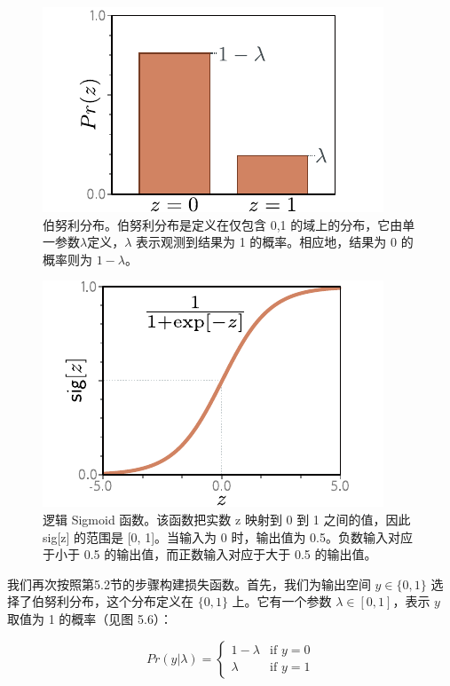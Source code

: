 \documentclass[lang=cn,newtx,10pt,scheme=chinese]{elegantbook}
\begin{document}
\begin{figure}[ht!]
	\centering
	\includegraphics[width=0.7\linewidth]{PDFFigures/UDLChap5PDF/LossBern.pdf}
	\caption{伯努利分布。伯努利分布是定义在仅包含 {0,1} 的域上的分布，它由单一参数\(\lambda\)定义，\(\lambda\) 表示观测到结果为 1 的概率。相应地，结果为 0 的概率则为 \(1 − \lambda\)。}
\end{figure}

\begin{figure}[ht!]
	\centering
	\includegraphics[width=0.7\linewidth]{PDFFigures/UDLChap5PDF/LossLogisticSigmoid.pdf}
	\caption{逻辑 Sigmoid 函数。该函数把实数 z 映射到 0 到 1 之间的值，因此 sig[z] 的范围是 [0, 1]。当输入为 0 时，输出值为 0.5。负数输入对应于小于 0.5 的输出值，而正数输入对应于大于 0.5 的输出值。}
\end{figure}



我们再次按照第5.2节的步骤构建损失函数。首先，我们为输出空间 \(y \in \{0, 1\}\) 选择了伯努利分布，这个分布定义在 \(\{0, 1\}\) 上。它有一个参数 \(\lambda \in [0, 1]\)，表示 \(y\) 取值为 1 的概率（见图 5.6）：

\begin{equation}
Pr(y|\lambda) = 
\begin{cases} 
	1 - \lambda & \text{if } y = 0 \\
	\lambda & \text{if } y = 1  
\end{cases} 
\end{equation}
\end{document}
